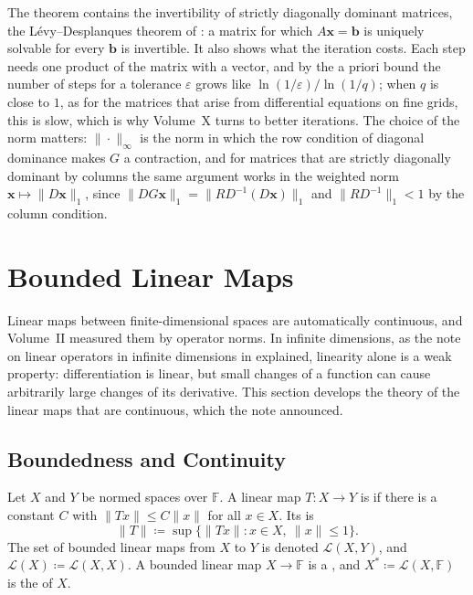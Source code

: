 The theorem contains the invertibility of strictly diagonally dominant matrices, the L\'evy--Desplanques theorem of : a matrix for which $A\mathbf x=\mathbf b$ is uniquely solvable for every $\mathbf b$ is invertible. It also shows what the iteration costs. Each step needs one product of the matrix with a vector, and by the a priori bound the number of steps for a tolerance $\varepsilon$ grows like $\ln(1/\varepsilon)/\ln(1/q)$; when $q$ is close to $1$, as for the matrices that arise from differential equations on fine grids, this is slow, which is why Volume~X turns to better iterations. The choice of the norm matters: $\|\cdot\|_\infty$ is the norm in which the row condition of diagonal dominance makes $G$ a contraction, and for matrices that are strictly diagonally dominant by columns the same argument works in the weighted norm $\mathbf x\mapsto\|D\mathbf x\|_1$, since $\|DG\mathbf x\|_1=\|RD^{-1}(D\mathbf x)\|_1$ and $\|RD^{-1}\|_1<1$ by the column condition.

\section{Bounded Linear Maps}
\label{sec:bounded-linear}

Linear maps between finite-dimensional spaces are automatically continuous, and Volume~II measured them by operator norms. In infinite dimensions, as the note on linear operators in infinite dimensions in  explained, linearity alone is a weak property: differentiation is linear, but small changes of a function can cause arbitrarily large changes of its derivative. This section develops the theory of the linear maps that are continuous, which the note announced.

\subsection{Boundedness and Continuity}

\begin{definition}
\label{def:bounded-operator}
Let $X$ and $Y$ be normed spaces over $\mathbb F$. A linear map $T\colon X\to Y$ is  if there is a constant $C$ with $\|Tx\|\le C\|x\|$ for all $x\in X$. Its  is
\[
\|T\|\coloneqq\sup\{\|Tx\|: x\in X,\ \|x\|\le1\} .
\]
The set of bounded linear maps from $X$ to $Y$ is denoted $\mathcal L(X,Y)$, and $\mathcal L(X)\coloneqq\mathcal L(X,X)$. A bounded linear map $X\to\mathbb F$ is a , and $X^*\coloneqq\mathcal L(X,\mathbb F)$ is the  of $X$.
\end{definition}

